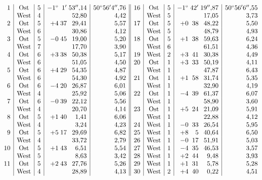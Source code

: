{\small
\setlength{\arraycolsep}{3.2pt}
\renewcommand{\arraystretch}{1.06}
\[
\begin{array}{@{}r|c|c|r@{\;}r@{\;}r|r||r|c|c|r@{\;}r@{\;}r|r@{}}
1&\text{Ost}&5&-1^\circ&1'&53''{,}14&50^\circ56'4''{,}76&
16&\text{Ost}&5&-1^\circ&42'&19''{,}87&50^\circ56'6''{,}55\\
&\text{West}&4&&&52{,}80&4{,}42&&\text{West}&5&&&17{,}05&3{,}73\\
2&\text{Ost}&5&+4&37&29{,}41&5{,}57&17&\text{Ost}&5&+0&38&48{,}22&5{,}50\\
&\text{West}&6&&&30{,}86&4{,}12&&\text{West}&5&&&48{,}79&4{,}93\\
3&\text{Ost}&5&-0&45&19{,}00&5{,}20&18&\text{Ost}&5&+1&38&59{,}63&6{,}24\\
&\text{West}&7&&&17{,}70&3{,}90&&\text{West}&6&&&61{,}51&4{,}36\\
4&\text{Ost}&6&+3&38&50{,}38&5{,}17&19&\text{West}&2&+3&41&30{,}38&4{,}49\\
&\text{West}&6&&&51{,}05&4{,}50&20&\text{Ost}&1&+3&33&50{,}19&4{,}11\\
5&\text{Ost}&6&+4&29&54{,}35&4{,}87&&\text{West}&1&&&47{,}87&6{,}43\\
&\text{West}&6&&&54{,}30&4{,}92&21&\text{Ost}&1&+1&58&31{,}74&5{,}35\\
6&\text{Ost}&6&-4&20&26{,}87&6{,}01&&\text{West}&1&&&32{,}90&4{,}19\\
&\text{West}&4&&&25{,}92&5{,}06&22&\text{Ost}&1&-4&39&61{,}37&6{,}07\\
7&\text{Ost}&6&-0&39&22{,}12&5{,}56&&\text{West}&1&&&58{,}90&3{,}60\\
&\text{West}&4&&&20{,}70&4{,}14&23&\text{Ost}&1&+5&24&21{,}09&5{,}91\\
8&\text{Ost}&5&+1&40&1{,}41&6{,}06&&\text{West}&1&&&22{,}88&4{,}12\\
&\text{West}&4&&&3{,}24&4{,}23&24&\text{West}&1&-0&33&26{,}54&5{,}95\\
9&\text{Ost}&5&+5&17&29{,}69&6{,}82&25&\text{West}&1&+8&5&40{,}64&6{,}50\\
&\text{West}&4&&&33{,}72&2{,}79&26&\text{West}&1&-0&17&51{,}91&5{,}03\\
10&\text{Ost}&5&+1&43&6{,}51&5{,}54&27&\text{West}&1&-4&35&46{,}53&3{,}57\\
&\text{West}&5&&&8{,}63&3{,}42&28&\text{West}&1&+2&44&9{,}48&3{,}93\\
11&\text{Ost}&5&+2&43&27{,}76&5{,}26&29&\text{West}&1&+1&31&5{,}78&5{,}28\\
&\text{West}&4&&&28{,}89&4{,}13&30&\text{West}&2&+4&40&0{,}22&4{,}51\\

\end{array}\]}
